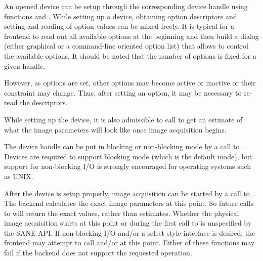 \documentclass[11pt,DVIps]{report}
\begin{document}
An opened device can be setup through the corresponding device handle
using functions  and
.  While setting up a device, obtaining
option descriptors and setting and reading of option values can be
mixed freely.  It is typical for a frontend to read out all available
options at the beginning and then build a dialog (either graphical or
a command-line oriented option list) that allows to control the
available options.  It should be noted that the number of options is
fixed for a given handle. 
\begin{changebar}
  However, as options are set, other options may become active or inactive or
  their constraint may change. Thus, after setting an option, it may be
  necessary to re-read the descriptors.
\end{changebar}
While
setting up the device, it is also admissible to call
 to get an estimate of what the image
parameters will look like once image acquisition begins.

The device handle can be put in blocking or non-blocking mode by a
call to .  Devices are required to support
blocking mode (which is the default mode), but support for
non-blocking I/O is strongly encouraged for operating systems such as
UNIX.

After the device is setup properly, image acquisition can be started
by a call to .  The backend calculates the exact
image parameters at this point.  So future calls to
 will return the exact values, rather
than estimates.  Whether the physical image acquisition starts at this
point or during the first call to  is unspecified
by the SANE API.  If non-blocking I/O and/or a select-style interface
is desired, the frontend may attempt to call
 and/or  at
this point.  Either of these functions may fail if the backend does
not support the requested operation.
\end{document}
